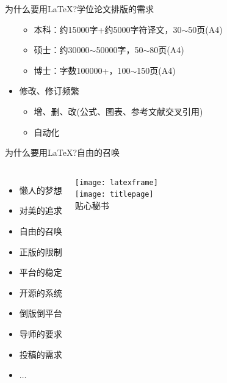 \documentclass[fontset = adobe, xcolor=svgnames, t, aspectratio=169]{ctexbeamer}
\begin{document}
\begin{frame}{为什么要用\LaTeX?}{学位论文排版的需求}
\begin{spacing}{0.65}
\begin{itemize}
\begin{itemize}
    \item 本科：约15000字+约5000字符译文，30$\sim$50页(A4)
    \item 硕士：约30000$\sim$50000字，50$\sim$80页(A4)
    \item 博士：字数100000+，100$\sim$150页(A4)
    \end{itemize}  
  \item 修改、修订\alert{频繁}
    \begin{itemize}
    \item 增、删、改(公式、图表、参考文献交叉引用)
    \item \alert{自动化}
    \end{itemize}  
  \end{itemize}
  \end{spacing}
\end{frame}

\begin{frame}{为什么要用\LaTeX?}{自由的召唤}
  \begin{columns}[c]
    \begin{itemize} \setlength\itemsep{1em}
    \item \alert{懒人}的梦想
    \item 对\alert{美}的追求
    \item \alert{自由}的召唤
    \item \alert{正版}的限制
    \item 平台的\alert{稳定}
    \item \alert{开源}的系统
    \item \alert{倒版倒平台}
    \item \alert{导师}的要求
    \item \alert{投稿}的需求
    \item $\ldots$\hphantom{倒版倒a}%
    \end{itemize}
    \begin{center}
      \texttt{[image: latexframe]}\\
      \texttt{[image: titlepage]}\\%
      贴心\alert{秘书}
    \end{center}
  \end{columns}
\end{frame}
\end{document}
